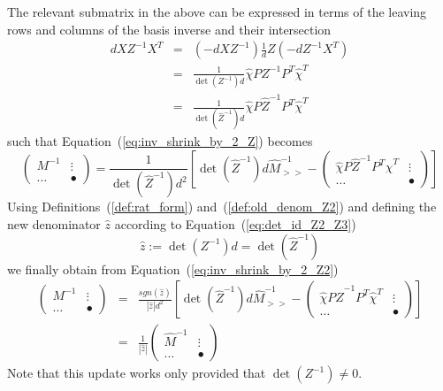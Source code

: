 \documentclass[a4paper]{article}
\begin{document}
The relevant submatrix in the above can be expressed in terms of the leaving
rows and columns of the basis inverse and their intersection
\begin{eqnarray}
dXZ^{-1}X^{T}
&=&
\left(-dXZ^{-1}\right)\frac{1}{d}Z\left(-dZ^{-1}X^{T}\right) \\
&=&
\frac{1}{\det(Z^{-1})d}
\hat{\chi} PZ^{-1}P^{T}\hat{\chi}^{T} \\
&=&
\frac{1}{\det(\hat{Z}^{-1})d}
\hat{\chi} P\hat{Z}^{-1}P^{T}\hat{\chi}^{T}
\end{eqnarray}
such that Equation~(\ref{eq:inv_shrink_by_2_Z}) becomes
\begin{equation}
\label{eq:inv_shrink_by_2_Z2}
\left(
\begin{array}{c|c}
M^{-1}  & \vdots \\
\hline
\hdots  & \bullet
\end{array}
\right)
=
\frac{1}{\det(\hat{Z}^{-1})d^{2}}
\left[
\det(\hat{Z}^{-1})d\hat{M}_{>>}^{-1}
-
\left(
\begin{array}{c|c}
\hat{\chi} P\hat{Z}^{-1}P^{T} \hat{\chi}^{T} & \vdots \\
\hline
\hdots                           & \bullet
\end{array}
\right)
\right]
\end{equation}
Using Definitions~(\ref{def:rat_form}) and~(\ref{def:old_denom_Z2}) and
defining the new denominator $\hat{z}$ according to
Equation~(\ref{eq:det_id_Z2_Z3})
\begin{equation}
\label{def:new_denom_Z2}
\hat{z}:=\det(Z^{-1})d = \det(\hat{Z}^{-1})
\end{equation}
we finally obtain from Equation~(\ref{eq:inv_shrink_by_2_Z2})
\begin{eqnarray}
\left(
\begin{array}{c|c}
M^{-1}  & \vdots \\
\hline
\hdots  & \bullet
\end{array}
\right)
&=&
\frac{sgn(\hat{z})}{\left|\hat{z}\right|d^{2}}
\left[
\det(\hat{Z}^{-1})d\hat{M}_{>>}^{-1}
-
\left(
\begin{array}{c|c}
\hat{\chi} P\hat{Z}^{-1}P^{T} \hat{\chi}^{T} & \vdots \\
\hline
\hdots                           & \bullet	
\end{array}
\right)
\right]
\nonumber \\
&=&
\frac{1}{\left|\hat{z}\right|}
\left(
\begin{array}{c|c}
\hat{M}^{-1} & \vdots \\
\hline
\hdots       & \bullet
\end{array}
\right)
\end{eqnarray}
Note that this update works only provided that $\det(Z^{-1}) \neq 0$.
\end{document}
